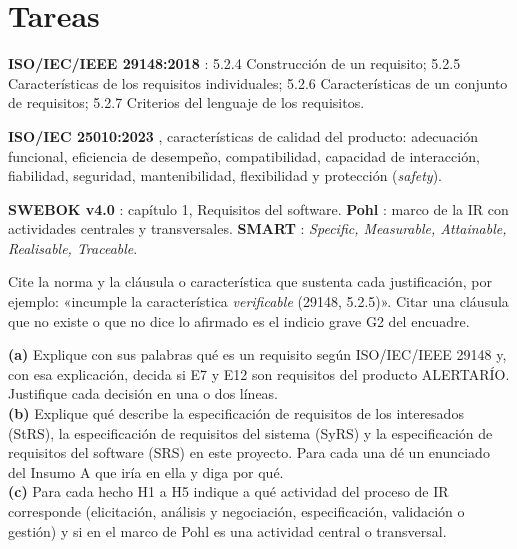 \documentclass[11pt]{article}
\newcommand{\seccion}[1]{\section{\textcolor{utegreendk}{#1}}}
\begin{document}
\seccion{Tareas}

\begin{cajaclave}[title={Referencias que puede citar (sin consultar los documentos)}]
	\textbf{ISO/IEC/IEEE 29148:2018} \citep{iso29148_2018}: 5.2.4 Construcción de un requisito; 5.2.5 Características de los requisitos individuales; 5.2.6 Características de un conjunto de requisitos; 5.2.7 Criterios del lenguaje de los requisitos.\par
	\textbf{ISO/IEC 25010:2023} \citep{iso25010_2023}, características de calidad del producto: adecuación funcional, eficiencia de desempeño, compatibilidad, capacidad de interacción, fiabilidad, seguridad, mantenibilidad, flexibilidad y protección (\emph{safety}).\par
	\textbf{SWEBOK v4.0} \citep{swebok_v4_2024}: capítulo 1, Requisitos del software. \textbf{Pohl} \citep{pohl_2025}: marco de la IR con actividades centrales y transversales. \textbf{SMART} \citep{mannion_smart_1995}: \emph{Specific, Measurable, Attainable, Realisable, Traceable}.\par
	Cite la norma y la cláusula o característica que sustenta cada justificación, por ejemplo: «incumple la característica \emph{verificable} (29148, 5.2.5)». Citar una cláusula que no existe o que no dice lo afirmado es el indicio grave G2 del encuadre.
\end{cajaclave}

\begin{cajatarea}[title={T1. Conceptos aplicados al caso \hfill D1 · 10\,\%}]
	\textbf{(a)} Explique con sus palabras qué es un requisito según ISO/IEC/IEEE 29148 y, con esa explicación, decida si E7 y E12 son requisitos del producto ALERTARÍO. Justifique cada decisión en una o dos líneas.\\[4pt]
	\textbf{(b)} Explique qué describe la especificación de requisitos de los interesados (StRS), la especificación de requisitos del sistema (SyRS) y la especificación de requisitos del software (SRS) en este proyecto. Para cada una dé un enunciado del Insumo A que iría en ella y diga por qué.\\[4pt]
	\textbf{(c)} Para cada hecho H1 a H5 indique a qué actividad del proceso de IR corresponde (elicitación, análisis y negociación, especificación, validación o gestión) y si en el marco de Pohl es una actividad central o transversal.
\end{cajatarea}
\end{document}
